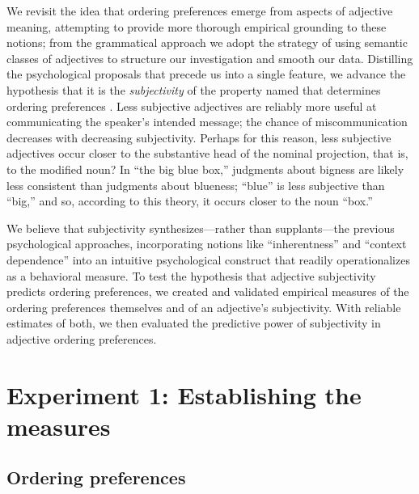 \documentclass[12pt]{article}
\begin{document}
We revisit the idea that ordering preferences emerge from aspects of adjective meaning, attempting to provide more thorough empirical grounding to these notions;
from the grammatical approach we adopt the strategy of using semantic classes of adjectives to structure our investigation and smooth our data. 
Distilling the psychological proposals that precede us into a single feature, we advance the hypothesis that it is the \emph{subjectivity} of the property named that determines ordering preferences \citep{hetzron1978,Quirk1985,hill2012}. Less subjective adjectives are reliably more useful at communicating the speaker's intended message; the chance of miscommunication decreases with decreasing subjectivity. 
Perhaps for this reason, less subjective adjectives occur closer to the substantive head of the nominal projection, that is, to the modified noun?  
In ``the big blue box,'' judgments about bigness are likely less consistent than judgments about blueness; ``blue'' is less subjective than ``big,'' and so, according to this theory, it occurs closer to the noun ``box.'' 

We believe that subjectivity synthesizes---rather than supplants---the previous psychological approaches, incorporating notions like ``inherentness'' and ``context dependence'' into an intuitive psychological construct that readily operationalizes as a behavioral measure. 
To test the hypothesis that adjective subjectivity predicts ordering preferences, we created and validated empirical measures of the ordering preferences themselves and of an adjective's subjectivity. With reliable estimates of both, we then evaluated the predictive power of subjectivity in adjective ordering preferences.  %

\section{Experiment 1: Establishing the measures}

\subsection{Ordering preferences}
\end{document}
